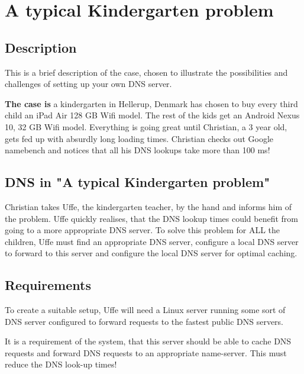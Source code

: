 \chapter{A typical Kindergarten problem}
\section{Description}
This is a brief description of the case, chosen to illustrate the possibilities and challenges of setting up your own DNS server.

\textbf{The case is}
a kindergarten in Hellerup, Denmark has chosen to buy every third child an iPad Air 128 GB Wifi model. The rest of the kids get an Android Nexus 10, 32 GB Wifi model. Everything is going great until Christian, a 3 year old, gets fed up with absurdly long loading times. Christian checks out Google namebench and notices that all his DNS lookups take more than 100 ms!

\section{DNS in "A typical Kindergarten problem"}

Christian takes Uffe, the kindergarten teacher, by the hand and informs him of the problem. Uffe quickly realises, that the DNS lookup times could benefit from going to a more appropriate DNS server. To solve this problem for ALL the children, Uffe must find an appropriate DNS server, configure a local DNS server to forward to this server and configure the local DNS server for optimal caching.


\section{Requirements}
To create a suitable setup, Uffe will need a Linux server running some sort of DNS server configured to forward requests to the fastest public DNS servers.

It is a requirement of the system, that this server should be able to cache DNS requests and forward DNS requests to an appropriate name-server.
This must reduce the DNS look-up times!
